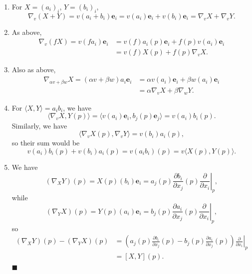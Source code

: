 \documentclass[letter-paper]{tufte-book}
\newenvironment{proof}[1][Proof]{\begin{trivlist}
\item[\hskip \labelsep {\bfseries #1}]}{\end{trivlist}}
\newcommand{\qed}{\hfill$\blacksquare$}
\begin{document}
\begin{proof}
  \begin{enumerate}
    \item For $X = (a_i)_i$, $Y = (b_i)_i$,
    \begin{equation*}
      \nabla_v (X+Y) = v(a_i + b_i)\boldsymbol{e}_i = v(a_i)\boldsymbol{e}_i + v(b_i)\boldsymbol{e}_i = \nabla_v X + \nabla_v Y.
    \end{equation*}
    
    \item As above,
    \begin{align*}
      \nabla_v(fX) = v(fa_i)\boldsymbol{e}_i 
        &= v(f)a_i(p)\boldsymbol{e}_i + f(p)v(a_i)\boldsymbol{e}_i\\
        &= v(f) X(p) + f(p) \nabla_v X.
    \end{align*}
    
    \item Also as above,
    \begin{align*}
      \nabla_{\alpha v+\beta w} X = (\alpha v + \beta w)a_i\boldsymbol{e}_i
        &= \alpha v(a_i)\boldsymbol{e}_i + \beta w(a_i)\boldsymbol{e}_i\\
        &= \alpha \nabla_v X + \beta \nabla_w Y.
    \end{align*}
    
    \item For $\langle X, Y\rangle = a_i b_i$, we have
    \begin{equation*}
      \langle \nabla_v X, Y(p)\rangle = \langle v(a_i)\boldsymbol{e}_i, b_j(p)\boldsymbol{e}_j \rangle = v(a_i) b_i(p).
    \end{equation*}
    Similarly, we have
    \begin{equation*}
      \langle \nabla_v X(p), \nabla_v Y\rangle = v(b_i) a_i(p),
    \end{equation*}
    so their sum would be
    \begin{equation*}
      v(a_i) b_i(p) + v(b_i)a_i(p) = v(a_i b_i)(p) = v\langle X(p), Y(p)\rangle.
    \end{equation*}
    
    \item We have
    \begin{equation*}
      (\nabla_X Y)(p) = X(p)(b_i)\boldsymbol{e}_i = a_j(p) \frac{\partial b_i}{\partial x_j}(p)\left.\frac{\partial}{\partial x_i}\right|_p,
    \end{equation*}
    while
    \begin{equation*}
      (\nabla_Y X)(p) = Y(p)(a_i)\boldsymbol{e}_i = b_j(p) \frac{\partial a_i}{\partial x_j}(p)\left.\frac{\partial}{\partial x_i}\right|_p,
    \end{equation*}
    so
    \begin{align*}
      (\nabla_X Y)(p) - (\nabla_Y X)(p) 
        &= \left(a_j(p) \frac{\partial b_i}{\partial x_j}(p) - b_j(p) \frac{\partial a_i}{\partial x_j}(p)\right)\left.\frac{\partial}{\partial x_i}\right|_p\\
        &=[X, Y](p).
    \end{align*}
    \qed
  \end{enumerate}
\end{proof}
\end{document}
